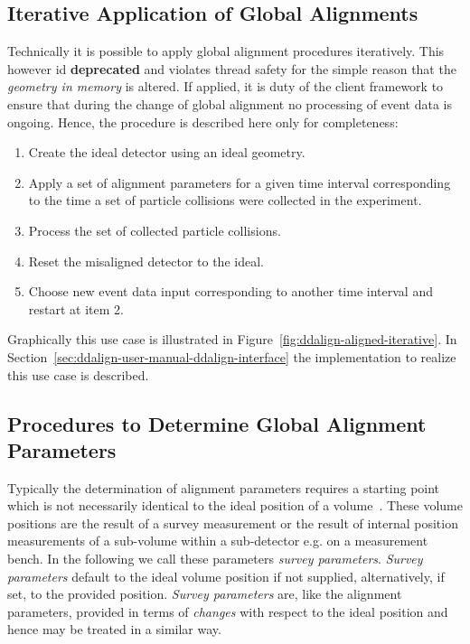 \documentclass[10pt,a4paper]{article}
\begin{document}
\subsection{Iterative Application of Global Alignments}
\label{subsect:ddalign-intro-iterative-alignments}
\noindent
Technically it is possible to apply global alignment procedures iteratively.
This however id {\bf{deprecated}} and violates thread safety for the simple reason
that the {\it{geometry in memory}} is altered. If applied, it is duty of the 
client framework to ensure that during the change of global alignment 
no processing of event data is ongoing.
Hence, the procedure is described here only for completeness:
\begin{enumerate}\itemcompact
\item Create the ideal detector using an ideal geometry.
\item Apply a set of alignment parameters for a given time 
    interval corresponding to the 
    time a set of particle collisions were collected in the experiment.
\item Process the set of collected particle collisions.
\item Reset the misaligned detector to the ideal.
\item Choose new event data input corresponding to another time interval
    and restart at item 2.
\end{enumerate}
Graphically this use case is illustrated in 
Figure~\ref{fig:ddalign-aligned-iterative}. In 
Section~\ref{sec:ddalign-user-manual-ddalign-interface} the implementation 
to realize this use case is described.

\subsection{Procedures to Determine Global Alignment Parameters}
\label{subsect:ddalign-intro-determine-alignment-params}
\noindent
Typically the determination of alignment parameters requires a starting point
which is not necessarily identical to the ideal position of a 
volume~\cite{bib:chris-parkes-priv-comm}. These volume positions are the result
of a survey measurement or the result of internal position measurements 
of a sub-volume within a sub-detector e.g. on a measurement bench.
In the following we call these parameters {\it{survey parameters}}. 
{\it{Survey parameters}} default to the ideal volume position if not supplied,
alternatively, if set, to the provided position. {\it{Survey parameters}}
are, like the alignment parameters, provided in terms of {\it{changes}} with 
respect to the ideal position and hence may be treated in a similar way.
\end{document}
